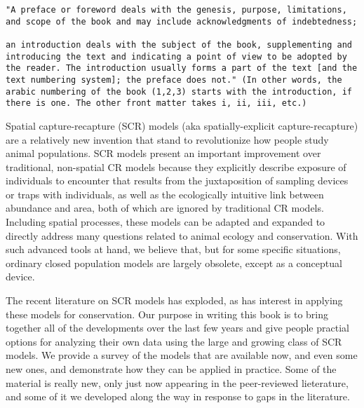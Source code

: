 \begin{verbatim}
"A preface or foreword deals with the genesis, purpose, limitations,
and scope of the book and may include acknowledgments of indebtedness;

an introduction deals with the subject of the book, supplementing and
introducing the text and indicating a point of view to be adopted by
the reader. The introduction usually forms a part of the text [and the
text numbering system]; the preface does not." (In other words, the
arabic numbering of the book (1,2,3) starts with the introduction, if
there is one. The other front matter takes i, ii, iii, etc.)
\end{verbatim}


Spatial capture-recapture (SCR) models (aka spatially-explicit
capture-recapture) are a relatively new invention that %
stand to
revolutionize how people study animal populations.
SCR models present
an important improvement over traditional, %
non-spatial CR models
because they explicitly describe exposure of individuals to encounter
that results from the juxtaposition of sampling devices or traps with
individuals, as well as the ecologically intuitive link between
abundance and area, both of which are ignored by traditional CR
models. Including spatial processes, these models can be adapted and
expanded to directly address many questions related to animal ecology
and conservation. With such advanced tools at hand, we believe that,
but for some specific situations, ordinary closed population models
are largely obsolete, %
except as a conceptual device.

The recent literature on SCR models has exploded, %
as has interest in applying these models for conservation.
Our purpose in writing this
book is to bring together all of the developments over the last few
years and give people practial options for analyzing their own data
using the large and growing class of SCR models.  We provide a survey
of the models that are available now, and even some new ones, and
demonstrate how they can be applied in practice. Some of the material
is really new, only just now appearing in the peer-reviewed
lieterature, and some of it we developed along the way in response to
gaps in the literature.

